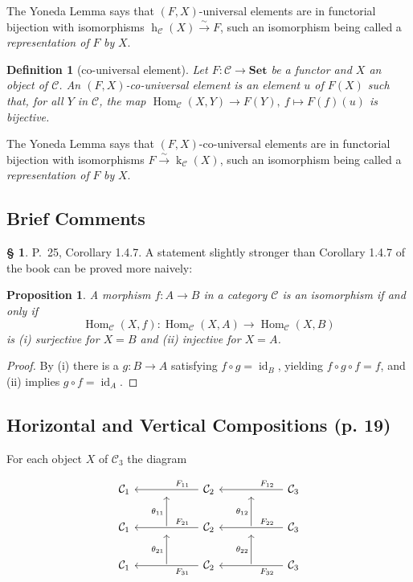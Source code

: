 \documentclass[12pt]{article}
\newtheorem{prop}[thm]{Proposition}
\newtheorem{df}[thm]{Definition}
\theoremstyle{remark}
\theoremstyle{definition}
\newtheorem{s}[thm]{\S}
\newcommand{\C}{\mathcal C}
\newcommand{\Set}{\mathbf{Set}}
\newcommand{\xr}{\xrightarrow}
\DeclareMathOperator{\hy}{h}
\DeclareMathOperator{\ky}{k}
\DeclareMathOperator{\id}{id}
\DeclareMathOperator{\Hom}{Hom}
\begin{document}
The Yoneda Lemma says that $(F,X)$\--universal elements are in functorial bijection with isomorphisms $\hy_\C(X)\xr\sim F$, such an isomorphism being called a {\em representation of} $F$ {\em by} $X$.

\begin{df}[co-universal element]\label{ue2} 
Let $F:\C\to\Set$ be a functor and $X$ an object of $\C$. An $(F,X)$\--{\em co-universal element} is an element $u$ of $F(X)$ such that, for all $Y$ in $\C$, the map $\Hom_\C(X,Y)\to F(Y),\ f\mapsto F(f)(u)$ is bijective. 
\end{df}

The Yoneda Lemma says that $(F,X)$\--co-universal elements are in functorial bijection with isomorphisms $F\xr\sim\ky_\C(X)$, such an isomorphism being called a {\em representation of} $F$ {\em by} $X$.


\subsection{Brief Comments}

\begin{s} 
P.~25, Corollary 1.4.7. A statement slightly stronger than Corollary 1.4.7 of the book can be proved more naively:

\begin{prop}\label{yp}
A morphism $f:A\to B$ in a category $\C$ is an isomorphism if and only if 
$$
\Hom_\C(X,f):\Hom_\C(X,A)\to\Hom_\C(X,B)
$$
is (i) surjective for $X=B$ and (ii) injective for $X=A$.
\end{prop}

\begin{proof} By (i) there is a $g:B\to A$ satisfying $f\circ g=\id_B$, yielding $f\circ g\circ f=f$, and (ii) implies $g\circ f=\id_A$.
\end{proof}
\end{s}


\subsection{Horizontal and Vertical Compositions (p. 19)}\label{hove1}

For each object $X$ of $\C_3$ the diagram 

$$
\begin{tikzcd}
%
\C_1&{}&\C_2\ar{ll}{}[near start,swap]{F_{11}}&{}&\C_3\ar{ll}{}[near start,swap]{F_{12}}\\ 
%
\C_1&\ar{u}{\theta_{11}}&\C_2\ar{ll}{}[near start,swap]{F_{21}}&\ar{u}{\theta_{12}}&\C_3\ar{ll}{}[near start,swap]{F_{22}}\\ 
%
\C_1&\ar{u}{\theta_{21}}&\C_2\ar{ll}{}[near start]{F_{31}}&\ar{u}{\theta_{22}}&\C_3\ar{ll}{}[near start]{F_{32}}
%
\end{tikzcd}
$$ 
\end{document}
